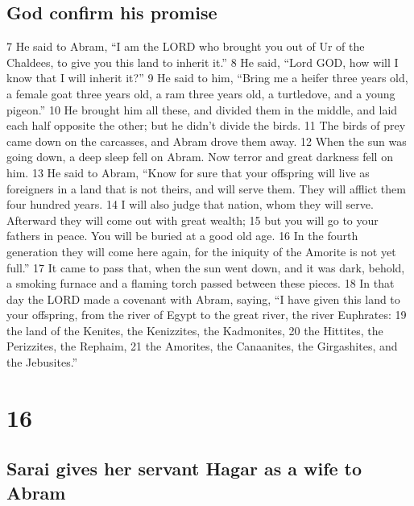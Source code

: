 \hypertarget{god-confirm-his-promise}{%
\subsection{God confirm his promise}\label{god-confirm-his-promise}}

{7} He said to Abram, ``I am the LORD who brought you out of Ur of the
Chaldees, to give you this land to inherit it.'' {8} He said, ``Lord
GOD, how will I know that I will inherit it?'' {9} He said to him,
``Bring me a heifer three years old, a female goat three years old, a
ram three years old, a turtledove, and a young pigeon.'' {10} He brought
him all these, and divided them in the middle, and laid each half
opposite the other; but he didn't divide the birds. {11} The birds of
prey came down on the carcasses, and Abram drove them away. {12} When
the sun was going down, a deep sleep fell on Abram. Now terror and great
darkness fell on him. {13} He said to Abram, ``Know for sure that your
offspring will live as foreigners in a land that is not theirs, and will
serve them. They will afflict them four hundred years. {14} I will also
judge that nation, whom they will serve. Afterward they will come out
with great wealth; {15} but you will go to your fathers in peace. You
will be buried at a good old age. {16} In the fourth generation they
will come here again, for the iniquity of the Amorite is not yet full.''
{17} It came to pass that, when the sun went down, and it was dark,
behold, a smoking furnace and a flaming torch passed between these
pieces. {18} In that day the LORD made a covenant with Abram, saying,
``I have given this land to your offspring, from the river of Egypt to
the great river, the river Euphrates: {19} the land of the Kenites, the
Kenizzites, the Kadmonites, {20} the Hittites, the Perizzites, the
Rephaim, {21} the Amorites, the Canaanites, the Girgashites, and the
Jebusites.''

\hypertarget{section-15}{%
\section{16}\label{section-15}}

\hypertarget{sarai-gives-her-servant-hagar-as-a-wife-to-abram}{%
\subsection{Sarai gives her servant Hagar as a wife to
Abram}\label{sarai-gives-her-servant-hagar-as-a-wife-to-abram}}

